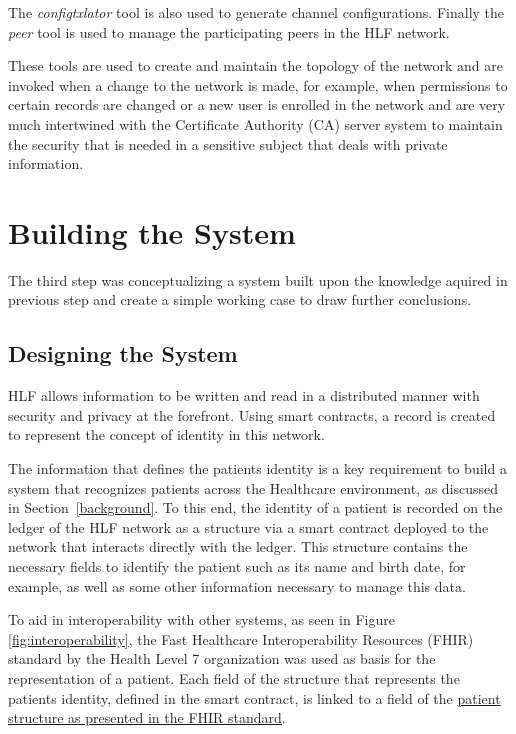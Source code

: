The \textit{configtxlator} tool is also used to generate channel
configurations.  Finally the \textit{peer} tool is used to manage the
participating peers in the HLF network.

These tools are used to create and maintain the topology of the network and are
invoked when a change to the network is made, for example, when permissions to
certain records are changed or a new user is enrolled in the network and are
very much intertwined with the Certificate Authority (CA) server system to
maintain the security that is needed in a sensitive subject that deals with
private information.

\section{Building the System}

The third step was conceptualizing a system built upon the knowledge aquired in
previous step and create a simple working case to draw further conclusions.

\subsection{Designing the System}

HLF allows information to be written and read in a distributed manner with
security and privacy at the forefront. Using smart contracts, a record is
created to represent the concept of identity in this network.

The information that defines the patients identity is a key requirement to
build a system that recognizes patients across the Healthcare environment, as
discussed in Section~\ref{background}.  To this end, the identity of a patient
is recorded on the ledger of the HLF network as a structure via a smart
contract deployed to the network that interacts directly with the ledger.  This
structure contains the necessary fields to identify the patient such as its
name and birth date, for example, as well as some other information necessary
to manage this data. 

To aid in interoperability with other systems, as seen in Figure
\ref{fig:interoperability}, the Fast Healthcare Interoperability Resources
(FHIR) standard by the Health Level 7 organization was used as basis for the
representation of a patient.  Each field of the structure that represents the
patients identity, defined in the smart contract, is linked to a field of the
\href{http://www.hl7.org/fhir/patient.html}{patient structure as presented in
the FHIR standard}.

